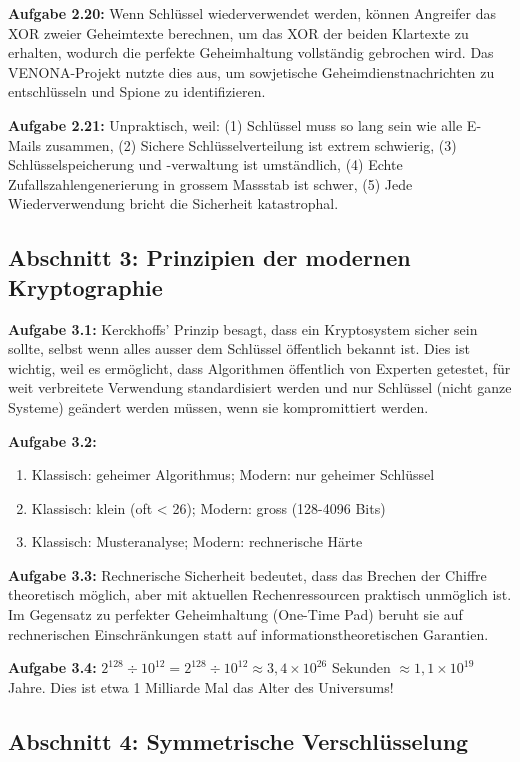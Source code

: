 \documentclass[11pt,a4paper]{report}
\begin{document}
\textbf{Aufgabe 2.20:}
Wenn Schlüssel wiederverwendet werden, können Angreifer das XOR zweier Geheimtexte berechnen, um das XOR der beiden Klartexte zu erhalten, wodurch die perfekte Geheimhaltung vollständig gebrochen wird. Das VENONA-Projekt nutzte dies aus, um sowjetische Geheimdienstnachrichten zu entschlüsseln und Spione zu identifizieren.

\textbf{Aufgabe 2.21:}
Unpraktisch, weil: (1) Schlüssel muss so lang sein wie alle E-Mails zusammen, (2) Sichere Schlüsselverteilung ist extrem schwierig, (3) Schlüsselspeicherung und -verwaltung ist umständlich, (4) Echte Zufallszahlengenerierung in grossem Massstab ist schwer, (5) Jede Wiederverwendung bricht die Sicherheit katastrophal.

\subsection*{Abschnitt 3: Prinzipien der modernen Kryptographie}

\textbf{Aufgabe 3.1:}
Kerckhoffs' Prinzip besagt, dass ein Kryptosystem sicher sein sollte, selbst wenn alles ausser dem Schlüssel öffentlich bekannt ist. Dies ist wichtig, weil es ermöglicht, dass Algorithmen öffentlich von Experten getestet, für weit verbreitete Verwendung standardisiert werden und nur Schlüssel (nicht ganze Systeme) geändert werden müssen, wenn sie kompromittiert werden.

\textbf{Aufgabe 3.2:}
\begin{enumerate}[label=\alph*)]
    \item Klassisch: geheimer Algorithmus; Modern: nur geheimer Schlüssel
    \item Klassisch: klein (oft < 26); Modern: gross (128-4096 Bits)
    \item Klassisch: Musteranalyse; Modern: rechnerische Härte
\end{enumerate}

\textbf{Aufgabe 3.3:}
Rechnerische Sicherheit bedeutet, dass das Brechen der Chiffre theoretisch möglich, aber mit aktuellen Rechenressourcen praktisch unmöglich ist. Im Gegensatz zu perfekter Geheimhaltung (One-Time Pad) beruht sie auf rechnerischen Einschränkungen statt auf informationstheoretischen Garantien.

\textbf{Aufgabe 3.4:}
$2^{128} \div 10^{12} = 2^{128} \div 10^{12} \approx 3,4 \times 10^{26}$ Sekunden $\approx 1,1 \times 10^{19}$ Jahre. Dies ist etwa 1 Milliarde Mal das Alter des Universums!

\subsection*{Abschnitt 4: Symmetrische Verschlüsselung}
\end{document}
